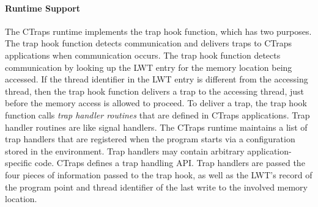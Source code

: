 \documentclass[preprint,9pt]{sigplanconf}
\newcommand{\ctraps}{CTraps\xspace}
\newcommand{\lwt}{LWT\xspace}
\begin{document}
\paragraph{Runtime Support}
The \ctraps runtime implements the trap hook function,  which has two purposes.
The trap hook function detects communication and delivers traps to \ctraps
applications when communication occurs.  The trap hook function detects
communication by looking up the \lwt entry for the memory location being
accessed.  If the thread identifier in the \lwt entry is different from the
accessing thread, then the trap hook function delivers a trap to the accessing
thread, just before the memory access is allowed to proceed.  To deliver a
trap, the trap hook function calls {\em trap handler routines} that are defined
in \ctraps applications.  Trap handler routines are like signal handlers.  The
\ctraps runtime maintains a list of trap handlers that are registered when the
program starts via a configuration stored in the environment.  Trap handlers
may contain arbitrary application-specific code.  \ctraps defines a trap
handling API.  Trap handlers are passed the four pieces of information passed
to the trap hook, as well as the \lwt's record of the program point and thread
identifier of the last write to the involved memory location.

\end{document}
